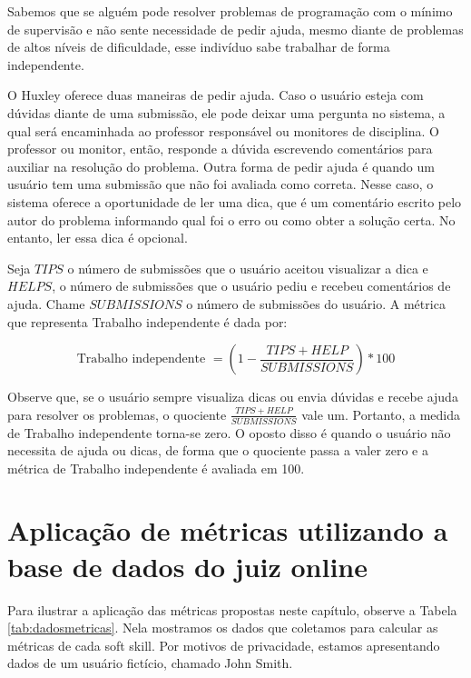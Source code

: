 Sabemos que se alguém pode resolver problemas de programação com o mínimo de supervisão e não sente necessidade de pedir ajuda, mesmo diante de problemas de altos níveis de dificuldade, esse indivíduo sabe trabalhar de forma independente.

O Huxley oferece duas maneiras de pedir ajuda. Caso o usuário esteja com dúvidas diante de uma submissão, ele pode deixar uma pergunta no sistema, a qual será encaminhada ao professor responsável ou monitores de disciplina. O professor ou monitor, então, responde a dúvida escrevendo comentários para auxiliar na resolução do problema. Outra forma de pedir ajuda é quando um usuário tem uma submissão que não foi avaliada como correta. Nesse caso, o sistema oferece a oportunidade de ler uma dica, que é um comentário escrito pelo autor do problema informando qual foi o erro ou como obter a solução certa. No entanto, ler essa dica é opcional.

Seja $TIPS$ o número de submissões que o usuário aceitou visualizar a dica e $HELPS$, o número de submissões que o usuário pediu e recebeu comentários de ajuda. Chame $SUBMISSIONS$ o número de submissões do usuário. A métrica que representa Trabalho independente é dada por:

\begin{equation} \label{m:independente}
\mbox{Trabalho independente } = \left(1 - \frac {TIPS + HELP}{SUBMISSIONS}\right) * 100
\end{equation}

Observe que, se o usuário sempre visualiza dicas ou envia dúvidas e recebe ajuda para resolver os problemas, o quociente 
$\frac {TIPS + HELP}{SUBMISSIONS}$ vale um. Portanto, a medida de Trabalho independente torna-se zero.
O oposto disso é quando o usuário não necessita de ajuda ou dicas, de forma que o quociente passa a valer zero e a métrica de Trabalho independente é avaliada em 100.

\section{Aplicação de métricas utilizando a base de dados do juiz online}
\label{sec:exemplo-metricas}

Para ilustrar a aplicação das métricas propostas neste capítulo, observe a Tabela \ref{tab:dadosmetricas}. Nela mostramos os dados que coletamos para calcular as métricas de cada soft skill. Por motivos de privacidade, estamos apresentando dados de um usuário fictício, chamado John Smith.

